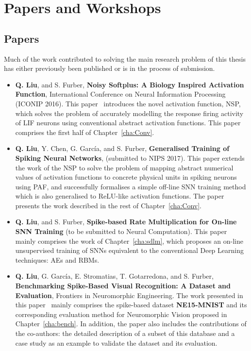    
\section{Papers and Workshops}

\subsection{Papers}
	Much of the work contributed to solving the main research problem of this thesis has either previously been published or is in the process of submission.
\begin{itemize}

	\item 
	\textbf{Q. Liu}, and S. Furber, \textbf{Noisy Softplus: A Biology Inspired Activation Function}, International Conference on Neural Information Processing (ICONIP 2016). 
	This paper~\citep{liu2016noisy} introduces the novel activation function, NSP, 
	which solves the problem of accurately modelling the response firing activity of LIF neurons using conventional abstract activation functions.
	This paper comprises the first half of Chapter~\ref{cha:Conv}.
	
	\item 
	\textbf{Q. Liu}, Y. Chen, G. Garc\'ia, and S. Furber, \textbf{Generalised Training of Spiking Neural Networks}, (submitted to NIPS 2017).
	This paper extends the work of the NSP to solve the problem of mapping abstract numerical values of activation functions to concrete physical units in spiking neurons using PAF, and successfully formalises a simple off-line SNN training method which is also generalised to ReLU-like activation functions.
	The paper presents the work described in the rest of Chapter~\ref{cha:Conv}.
	
	
	\item 
	\textbf{Q. Liu}, and S. Furber, \textbf{Spike-based Rate Multiplication for On-line SNN Training} (to be submitted to Neural Computation).
	This paper mainly comprises the work of Chapter~\ref{cha:sdlm}, which proposes an on-line unsupervised training of SNNs equivalent to the conventional Deep Learning techniques: AEs and RBMs.
	
	\item 
	\textbf{Q. Liu}, G. Garc\'ia, E. Stromatias, T. Gotarredona, and S. Furber, \textbf{Benchmarking Spike-Based Visual Recognition: A Dataset and Evaluation}, Frontiers in Neuromorphic Engineering.
	The work presented in this paper~\citep{liu2016bench} mainly comprises the spike-based dataset \textbf{NE15-MNIST} and its corresponding evaluation method for Neuromorphic Vision proposed in Chapter~\ref{cha:bench}.
	In addition, the paper also includes the contributions of the co-authors: the detailed description of a subset of this database and a case study as an example to validate the dataset and its evaluation. 
	
\end{itemize}

